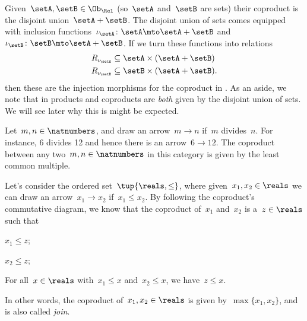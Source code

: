 
\begin{example}
  Given~$\setA,\setB\in \Ob_\Rel$ (so~$\setA$ and~$\setB$ are sets) their coproduct is the disjoint union~$\setA+\setB$.
  The disjoint union of sets comes equipped with inclusion functions~$\iota_\setA\colon \setA\mto \setA+\setB$ and~$\iota_\setB\colon \setB\mto \setA+\setB$.
  If we turn these functions into relations
  \begin{equation*}
    \begin{aligned}
      R_{\iota_\setA}&\subseteq \setA\times (\setA+\setB)\\
      R_{\iota_\setB}&\subseteq \setB\times (\setA+\setB).
    \end{aligned}
  \end{equation*}
  then these are the injection morphisms for the coproduct in \Rel.
  As an aside, we note that in \Rel products and coproducts are \emph{both} given by the disjoint union of sets.
  We will see later why this is might be expected.
\end{example}

\begin{example}
  Let~$m,n\in \natnumbers$, and draw an arrow~$m\to n$ if~$m$ divides~$n$. For instance, 6 divides 12 and hence there is an arrow~$6\to 12$. The coproduct between any two~$m,n\in \natnumbers$ in this category is given by the least common multiple.
\end{example}

\begin{example}
  Let's consider the ordered set~$\tup{\reals,\leq}$, where given~$x_1,x_2\in \reals$ we can draw an arrow~$x_1\to x_2$ if~$x_1\leq x_2$. By following the coproduct's commutative diagram, we know that the coproduct of~$x_1$ and~$x_2$ is a~$z\in \reals$ such that
  \begin{compactitem}
    \item $x_1\leq z$;
    \item $x_2\leq z$;
    \item For all~$x\in \reals$ with~$x_1\leq x$ and~$x_2\leq x$, we have~$z\leq x$.
  \end{compactitem}
  In other words, the coproduct of~$x_1,x_2\in \reals$ is given by~$\max\{x_1,x_2\}$, and is also called \emph{join}.
\end{example}

